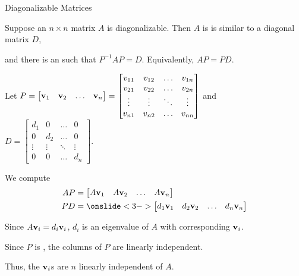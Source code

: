\documentclass[xcolor=dvipsnames,aspectratio=169,t]{beamer}
\begin{document}
\begin{frame}{Diagonalizable Matrices}
  \smallskip

  Suppose an $n \times n$ matrix $A$ is \alert{diagonalizable}.
  Then $A$ is is similar to a diagonal matrix $D$,
  \smallskip
  
  and there is an  such that $P^{-1}AP=D$.
  Equivalently, $AP=PD$.
  \medskip
  
  {\small
  Let $P = \begin{bmatrix} \mathbf{v}_1 & \mathbf{v}_2 & \ldots & \mathbf{v}_n \end{bmatrix}
         = \begin{bmatrix}
             v_{11} & v_{12} & \ldots & v_{1n} \\
             v_{21} & v_{22} & \ldots & v_{2n} \\
             \vdots & \vdots & \ddots & \vdots \\
             v_{n1} & v_{n2} & \ldots & v_{nn}
           \end{bmatrix}$
  and $D = \begin{bmatrix} 
        d_1 & 0 & \ldots & 0 \\
        0 & d_2 & \ldots & 0 \\
        \vdots & \vdots & \ddots & \vdots \\
        0 & 0 & \ldots & d_n \end{bmatrix}$.
  }
  \medskip
  
  \pause
  We compute
    \begin{align*}
      AP &= \begin{bmatrix} A \v_1 & A \v_2 & \ldots & A \v_n \end{bmatrix}  \\
      PD &= \onslide<3->{\begin{bmatrix} d_1\v_1 & d_2 \v_2 & \ldots & d_n \v_n \end{bmatrix}}
    \end{align*}
  \vspace*{-.75em}
  
  \pause  %
  \pause
  Since $A\mathbf{v}_i=d_i \mathbf{v}_i$, $d_i$ is an \alert{eigenvalue} of $A$ with corresponding  $\mathbf{v}_i$.
  \bigskip
  
  \pause
  Since $P$ is , the columns of $P$ are \alert{linearly independent}.
  \smallskip
  
  \qquad Thus, the $\mathbf{v}_i$s are $n$ linearly independent  of $A$.
\end{frame}
\end{document}
